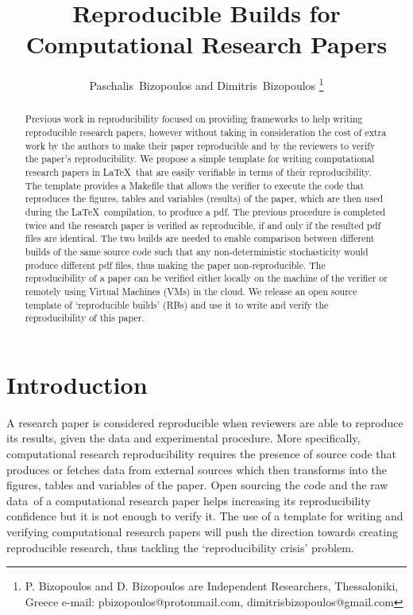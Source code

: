 \documentclass[journal]{IEEEtran}
\begin{document}

\title{Reproducible Builds for\\ Computational Research Papers}

\author{Paschalis~Bizopoulos and Dimitris~Bizopoulos
\thanks{P. Bizopoulos and D. Bizopoulos are Independent Researchers, Thessaloniki, Greece e-mail: pbizopoulos@protonmail.com, dimitrisbizopoulos@gmail.com}}

\maketitle

\begin{abstract}
	Previous work in reproducibility focused on providing frameworks to help writing reproducible research papers, however without taking in consideration the cost of extra work by the authors to make their paper reproducible and by the reviewers to verify the paper's reproducibility.
	We propose a simple template for writing computational research papers in \LaTeX\ that are easily verifiable in terms of their reproducibility.
	The template provides a Makefile that allows the verifier to execute the code that reproduces the figures, tables and variables (results) of the paper, which are then used during the \LaTeX\ compilation, to produce a pdf.
	The previous procedure is completed twice and the research paper is verified as reproducible, if and only if the resulted pdf files are identical.
	The two builds are needed to enable comparison between different builds of the same source code such that any non-deterministic stochasticity would produce different pdf files, thus making the paper non-reproducible.
	The reproducibility of a paper can be verified either locally on the machine of the verifier or remotely using Virtual Machines (VMs) in the cloud.
	We release an open source template of `reproducible builds' (RBs) and use it to write and verify the reproducibility of this paper.
\end{abstract}

\section{Introduction}
A research paper is considered reproducible when reviewers are able to reproduce its results, given the data and experimental procedure.
More specifically, computational research reproducibility requires the presence of source code that produces or fetches data from external sources which then transforms into the figures, tables and variables of the paper.
Open sourcing the code and the raw data of a computational research paper helps increasing its reproducibility confidence but it is not enough to verify it.
The use of a template for writing and verifying computational research papers will push the direction towards creating reproducible research, thus tackling the `reproducibility crisis' problem.
\end{document}
